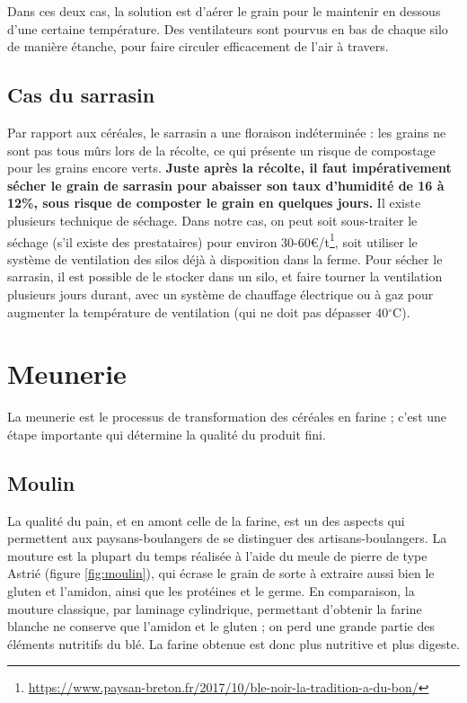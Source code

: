 \documentclass{book}
\begin{document}
Dans ces deux cas, la solution est d'aérer le grain pour le maintenir en dessous d'une certaine température. Des ventilateurs sont pourvus en bas de chaque silo de manière étanche, pour faire circuler efficacement de l'air à travers. 

\subsection{Cas du sarrasin}

Par rapport aux céréales, le sarrasin a une floraison indéterminée : les grains ne sont pas tous mûrs lors de la récolte, ce qui présente un risque de compostage pour les grains encore verts. \textbf{Juste après la récolte, il faut impérativement sécher le grain de sarrasin pour abaisser son taux d'humidité de 16 à 12\%, sous risque de composter le grain en quelques jours.} Il existe plusieurs technique de séchage. Dans notre cas, on peut soit sous-traiter le séchage (s'il existe des prestataires) pour environ 30-60\euro{}/t\footnote{\url{https://www.paysan-breton.fr/2017/10/ble-noir-la-tradition-a-du-bon/}}, soit utiliser le système de ventilation des silos déjà à disposition dans la ferme. Pour sécher le sarrasin, il est possible de le stocker dans un silo, et faire tourner la ventilation plusieurs jours durant, avec un système de chauffage électrique ou à gaz pour augmenter la température de ventilation (qui ne doit pas dépasser 40$^\circ$C).

\section{Meunerie}

La meunerie est le processus de transformation des céréales en farine ; c'est une étape importante qui détermine la qualité du produit fini.

\subsection{Moulin}

La qualité du pain, et en amont celle de la farine, est un des aspects qui permettent aux paysans-boulangers de se distinguer des artisans-boulangers. La mouture est la plupart du temps réalisée à l'aide du meule de pierre de type Astrié (figure \ref{fig:moulin}), qui écrase le grain de sorte à extraire aussi bien le gluten et l'amidon, ainsi que les protéines et le germe. En comparaison, la mouture classique, par laminage cylindrique, permettant d'obtenir la farine blanche ne conserve que l'amidon et le gluten ; on perd une grande partie des éléments nutritifs du blé. La farine obtenue est donc plus nutritive et plus digeste.
\end{document}
